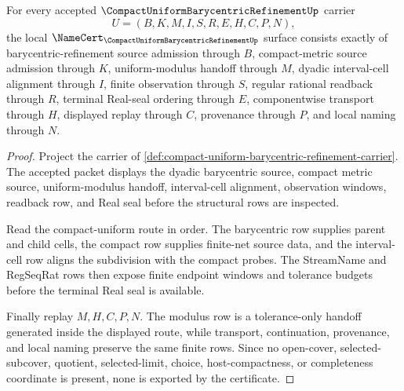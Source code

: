 \begin{theorem}\label{thm:compact-uniform-barycentric-refinement-namecert-obligations}
For every accepted $\CompactUniformBarycentricRefinementUp$ carrier
$$
U=(B,K,M,I,S,R,E,H,C,P,N),
$$
the local $\NameCert_{\CompactUniformBarycentricRefinementUp}$ surface consists exactly of barycentric-refinement source admission through $B$, compact-metric source admission through $K$, uniform-modulus handoff through $M$, dyadic interval-cell alignment through $I$, finite observation through $S$, regular rational readback through $R$, terminal Real-seal ordering through $E$, componentwise transport through $H$, displayed replay through $C$, provenance through $P$, and local naming through $N$.
\end{theorem}
\begin{proof}
Project the carrier of \autoref{def:compact-uniform-barycentric-refinement-carrier}. The accepted packet displays the dyadic barycentric source, compact metric source, uniform-modulus handoff, interval-cell alignment, observation windows, readback row, and Real seal before the structural rows are inspected.

Read the compact-uniform route in order. The barycentric row supplies parent and child cells, the compact row supplies finite-net source data, and the interval-cell row aligns the subdivision with the compact probes. The StreamName and RegSeqRat rows then expose finite endpoint windows and tolerance budgets before the terminal Real seal is available.

Finally replay $M,H,C,P,N$. The modulus row is a tolerance-only handoff generated inside the displayed route, while transport, continuation, provenance, and local naming preserve the same finite rows. Since no open-cover, selected-subcover, quotient, selected-limit, choice, host-compactness, or completeness coordinate is present, none is exported by the certificate.
\end{proof}

